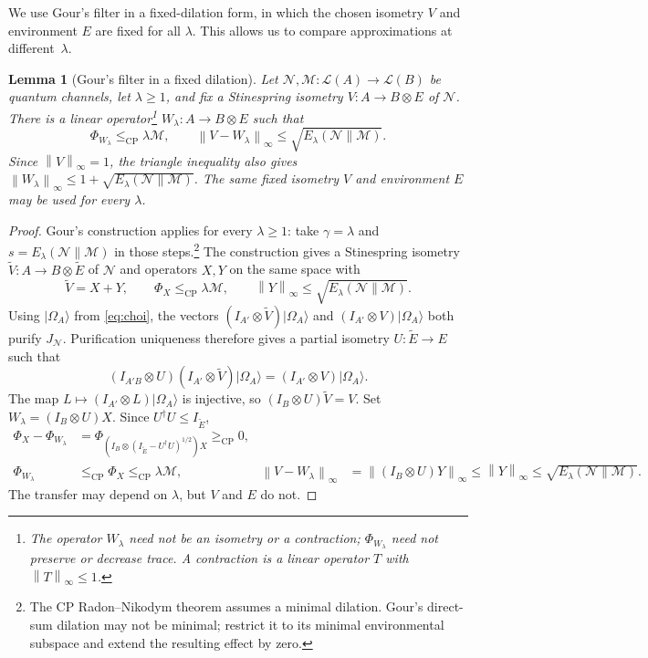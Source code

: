 \documentclass[11pt,letterpaper]{article}
\numberwithin{equation}{section}
\newtheorem{lemma}[theorem]{Lemma}
\newcommand{\N}{\mathcal N}
\newcommand{\M}{\mathcal M}
\newcommand{\cp}{\mathrm{CP}}
\newcommand{\cL}{\mathcal L}
\newcommand{\norm}[1]{\left\lVert#1\right\rVert}
\begin{document}
We use Gour's filter \cite[Eqs.~(44)--(49)]{Gour} in a fixed-dilation form, in which the chosen isometry $V$ and environment $E$ are fixed for all $\lambda$. This allows us to compare approximations at different~$\lambda$.

\begin{samepage}
\begin{lemma}[Gour's filter in a fixed dilation]\label{lem:filter}
Let $\N,\M:\cL(A)\to\cL(B)$ be quantum channels, let $\lambda\ge1$, and fix a Stinespring isometry $V:A\to B\otimes E$ of $\N$. There is a linear operator\footnote{The operator $W_\lambda$ need not be an isometry or a contraction; $\Phi_{W_\lambda}$ need not preserve or decrease trace. A contraction is a linear operator $T$ with $\norm{T}_\infty\le1$.} $W_\lambda:A\to B\otimes E$ such that
\begin{equation}\label{eq:filter}
 \Phi_{W_\lambda}\le_{\cp}\lambda\M,\qquad
 \norm{V-W_\lambda}_\infty\le\sqrt{E_\lambda(\N\|\M)}.
\end{equation}
Since $\norm V_\infty=1$, the triangle inequality also gives
$\norm{W_\lambda}_\infty\le1+\sqrt{E_\lambda(\N\|\M)}$.
The same fixed isometry $V$ and environment $E$ may be used for every $\lambda$.
\end{lemma}
\end{samepage}

\begin{proof}
Gour's construction \cite[proof of Theorem~2, Eqs.~(44)--(49)]{Gour} applies for every $\lambda\ge1$: take $\gamma=\lambda$ and $s=E_\lambda(\N\|\M)$ in those steps.\footnote{The CP Radon--Nikodym theorem assumes a minimal dilation. Gour's direct-sum dilation may not be minimal; restrict it to its minimal environmental subspace and extend the resulting effect by zero.} The construction gives a Stinespring isometry $\widetilde V:A\to B\otimes\widetilde E$ of $\N$ and operators $X,Y$ on the same space with
\[
 \widetilde V=X+Y,\qquad
 \Phi_X\le_{\cp}\lambda\M,\qquad
 \norm{Y}_\infty\le\sqrt{E_\lambda(\N\|\M)}.
\]
Using $|\Omega_A\rangle$ from \eqref{eq:choi}, the vectors $(I_{A'}\otimes\widetilde V)|\Omega_A\rangle$ and $(I_{A'}\otimes V)|\Omega_A\rangle$ both purify $J_\N$. Purification uniqueness therefore gives a partial isometry $U:\widetilde E\to E$ such that
\[
 (I_{A'B}\otimes U)(I_{A'}\otimes\widetilde V)|\Omega_A\rangle
 =(I_{A'}\otimes V)|\Omega_A\rangle.
\]
The map $L\mapsto(I_{A'}\otimes L)|\Omega_A\rangle$ is injective, so $(I_B\otimes U)\widetilde V=V$. Set $W_\lambda=(I_B\otimes U)X$. Since $U^\dagger U\le I_{\widetilde E}$,
\begin{align*}
 \Phi_X-\Phi_{W_\lambda}
 &=\Phi_{(I_B\otimes(I_{\widetilde E}-U^\dagger U)^{1/2})X}\ge_{\cp}0,\\
 \Phi_{W_\lambda}&\le_{\cp}\Phi_X\le_{\cp}\lambda\M,
 &\norm{V-W_\lambda}_\infty
 &=\norm{(I_B\otimes U)Y}_\infty
 \le\norm Y_\infty\le\sqrt{E_\lambda(\N\|\M)}.
\end{align*}
The transfer may depend on $\lambda$, but $V$ and $E$ do not.
\end{proof}
\end{document}
